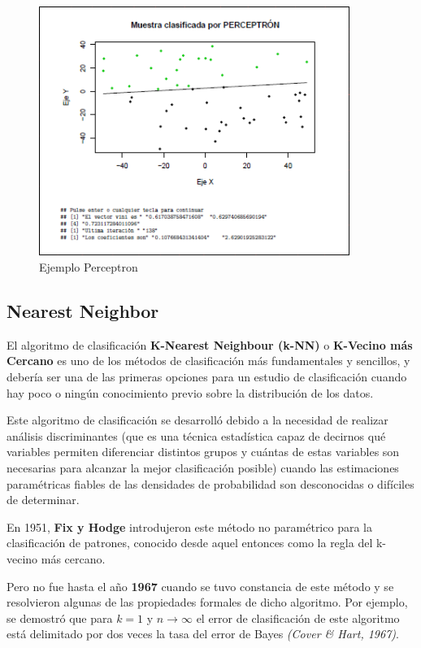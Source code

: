 \documentclass[a4paper, 11pt]{article} %
\begin{document}
\begin{figure}[H]
\centering
\includegraphics[width=0.9\textwidth]{ejemploPerceptron.PNG}
\caption{Ejemplo Perceptron}
\label{Ejemplo Perceptron}
\end{figure}
 
\subsection{Nearest Neighbor}
El algoritmo de clasificación \textbf{K-Nearest Neighbour (k-NN)} o \textbf{K-Vecino más Cercano} es uno de los métodos de clasificación más fundamentales y sencillos, y debería ser una de las primeras opciones para un estudio de clasificación cuando hay poco o ningún conocimiento previo sobre la distribución de los datos.

Este algoritmo de clasificación se desarrolló debido a la necesidad de realizar análisis discriminantes (que es una técnica estadística capaz de decirnos qué variables permiten diferenciar distintos grupos y cuántas de estas variables son necesarias para alcanzar la mejor clasificación posible) cuando las estimaciones paramétricas fiables de las densidades de probabilidad son desconocidas o difíciles de determinar.

En 1951, \textbf{Fix y Hodge} introdujeron este método no paramétrico para la clasificación de patrones, conocido desde aquel entonces como la regla del k-vecino más cercano.

Pero no fue hasta el año \textbf{1967} cuando se tuvo constancia de este método y se resolvieron algunas de las propiedades formales de dicho algoritmo. Por ejemplo, se demostró que para $k = 1$ y $n \rightarrow \infty$ el error de clasificación de este algoritmo está delimitado por dos veces la tasa del error de Bayes \textit{(Cover \& Hart, 1967)}.
\end{document}
